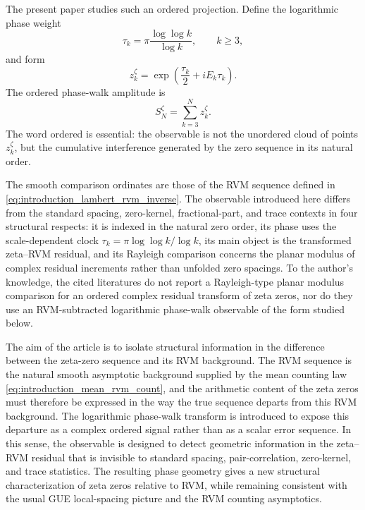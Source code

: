 \documentclass[12pt]{article}
\numberwithin{equation}{section}
\begin{document}
The present paper studies such an ordered projection.  Define the logarithmic phase weight
\begin{equation}
\tau_k=\pi\frac{\log\log k}{\log k},\qquad k\geq 3,
\label{eq:introduction_proper_time}
\end{equation}
and form
\begin{equation}
z_k^\zeta=\exp\left(\frac{\tau_k}{2}+iE_k\tau_k\right).
\label{eq:introduction_transformed_term}
\end{equation}
The ordered phase-walk amplitude is
\begin{equation}
S_N^\zeta=\sum_{k=3}^{N}z_k^\zeta.
\label{eq:introduction_primary_sum}
\end{equation}
The word ordered is essential: the observable is not the unordered cloud of points \(z_k^\zeta\), but the cumulative interference generated by the zero sequence in its natural order.

The smooth comparison ordinates are those of the RVM sequence defined in \eqref{eq:introduction_lambert_rvm_inverse}.
The observable introduced here differs from the standard spacing, zero-kernel, fractional-part, and trace contexts in four structural respects: it is indexed in the natural zero order, its phase uses the scale-dependent clock \(\tau_k=\pi\log\log k/\log k\), its main object is the transformed zeta--RVM residual, and its Rayleigh comparison concerns the planar modulus of complex residual increments rather than unfolded zero spacings.  To the author's knowledge, the cited literatures do not report a Rayleigh-type planar modulus comparison for an ordered complex residual transform of zeta zeros, nor do they use an RVM-subtracted logarithmic phase-walk observable of the form studied below.

The aim of the article is to isolate structural information in the difference between the zeta-zero sequence and its RVM background.  The RVM sequence is the natural smooth asymptotic background supplied by the mean counting law \eqref{eq:introduction_mean_rvm_count}, and the arithmetic content of the zeta zeros must therefore be expressed in the way the true sequence departs from this RVM background.  The logarithmic phase-walk transform is introduced to expose this departure as a complex ordered signal rather than as a scalar error sequence.  In this sense, the observable is designed to detect geometric information in the zeta--RVM residual that is invisible to standard spacing, pair-correlation, zero-kernel, and trace statistics.  The resulting phase geometry gives a new structural characterization of zeta zeros relative to RVM, while remaining consistent with the usual GUE local-spacing picture and the RVM counting asymptotics.
\end{document}
